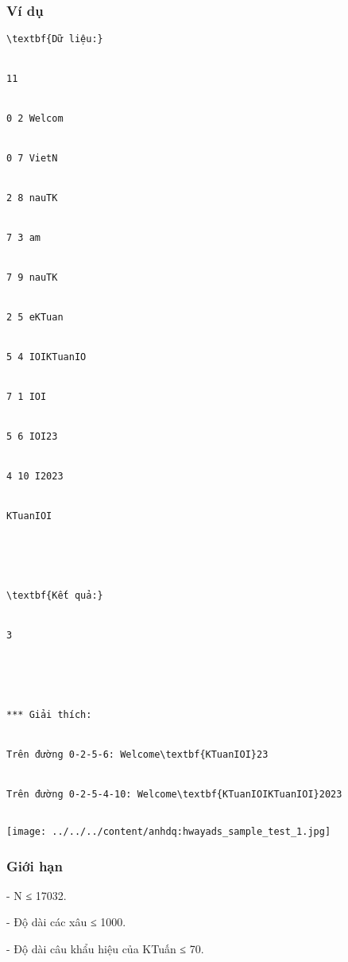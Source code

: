 \subsubsection{   Ví dụ  }
\begin{verbatim}
\textbf{Dữ liệu:}


11


0 2 Welcom


0 7 VietN


2 8 nauTK


7 3 am


7 9 nauTK


2 5 eKTuan


5 4 IOIKTuanIO


7 1 IOI


5 6 IOI23


4 10 I2023


KTuanIOI





\textbf{Kết quả:}


3





*** Giải thích:


Trên đường 0-2-5-6: Welcome\textbf{KTuanIOI}23


Trên đường 0-2-5-4-10: Welcome\textbf{KTuanIOIKTuanIOI}2023


\end{verbatim}


\texttt{[image: ../../../content/anhdq:hwayads\_sample\_test\_1.jpg]}

\subsubsection{   Giới hạn  }

   - N ≤ 17032.   


   - Độ dài các xâu ≤ 1000.   


   - Độ dài câu khẩu hiệu của KTuấn ≤ 70.  

